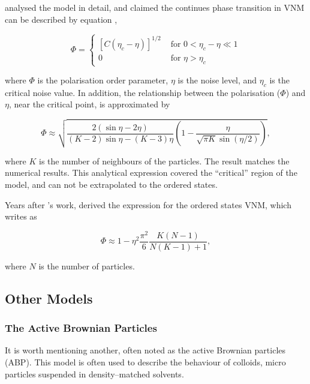 \documentclass[11pt,twoside]{report}
\begin{document}
\citeauthor{aldana2003} analysed the model in detail, and claimed the continues phase transition in VNM can be described by equation \cite{aldana2003},

\begin{equation}
	\Phi=\left\{\begin{array}{ll}{\left[C\left(\eta_{c}-\eta\right)\right]^{1 / 2}} & \text { for } 0<\eta_{c}-\eta \ll 1 \\ 0 & \text { for } \eta>\eta_{c}\end{array}\right.	
\end{equation}

\noindent where $\Phi$ is the polarisation order parameter, $\eta$ is the noise level, and $\eta_c$ is the critical noise value. In addition, the relationship between the polarisation ($\Phi$) and $\eta$, near the critical point, is approximated by

\begin{equation}
\Phi \approx \sqrt{
	\frac{2(\sin \eta-2 \eta)}{(K-2) \sin \eta-(K-3) \eta}\left(1-\frac{\eta}{\sqrt{\pi K} \sin (\eta / 2)}\right)
},
\end{equation}

\noindent where $K$ is the number of neighbours of the particles. The result matches the numerical results. This analytical expression covered the ``critical'' region of the model, and can not be extrapolated to the ordered states.

Years after \citeauthor{aldana2003}'s work, \citeauthor{porfiri2014} derived the expression for the ordered states VNM, which writes as \cite{porfiri2014}

\begin{equation}
\Phi \approx 1-\eta^{2} \frac{\pi^{2}}{6} \frac{K(N-1)}{N(K-1)+1},
\end{equation}

\noindent where $N$ is the number of particles.


\subsection{Other Models}

\subsubsection{The Active Brownian Particles}

It is worth mentioning another, often noted as the active Brownian particles (ABP). This model is often used to describe the behaviour of colloids, micro particles suspended in density--matched solvents.
\end{document}

